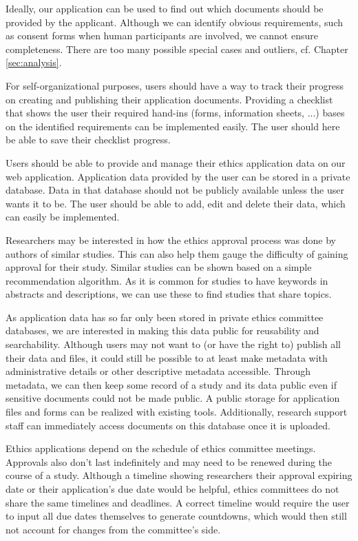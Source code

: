 \documentclass[10pt]{article}
\begin{document}
    \begin{A}
      \item Ideally, our application can be used to find out which documents should be provided by the applicant. Although we can identify obvious requirements, such as consent forms when human participants are involved, we cannot ensure completeness. There are too many possible special cases and outliers, cf. Chapter \ref{sec:analysis}. 
      \item For self-organizational purposes, users should have a way to track their  progress on creating and publishing their application documents. Providing a checklist that shows the user their required hand-ins (forms, information sheets, ...) bases on the identified requirements can be implemented easily. The user should here be able to save their checklist progress.
      \item Users should be able to provide and manage their ethics application data on our web application. Application data provided by the user can be stored in a private database. Data in that database should not be publicly available unless the user wants it to be. The user should be able to add, edit and delete their data, which can easily be implemented. 
      \item Researchers may be interested in how the ethics approval process was done by authors of similar studies. This can also help them gauge the difficulty of gaining approval for their study. Similar studies can be shown based on a simple recommendation algorithm. As it is common for studies to have keywords in abstracts and descriptions, we can use these to find studies that share topics. 
      \item As application data has so far only been stored in private ethics committee databases, we are interested in making this data public for reusability and searchability. Although users may not want to (or have the right to) publish all their data and files, it could still be possible to at least make metadata with administrative details or other descriptive metadata accessible. Through metadata, we can then keep some record of a study and its data public even if sensitive documents could not be made public. A public storage for application files and forms can be realized with existing tools. Additionally, research support staff can immediately access documents on this database once it is uploaded. 
      \item Ethics applications depend on the schedule of ethics committee meetings. Approvals also don't last indefinitely and may need to be renewed during the course of a study. Although a timeline showing researchers their approval expiring date or their application's due date would be helpful, ethics committees do not share the same timelines and deadlines. A correct timeline would require the user to input all due dates themselves to generate countdowns, which would then still not account for changes from the committee's side. 

\end{A}
\end{document}
